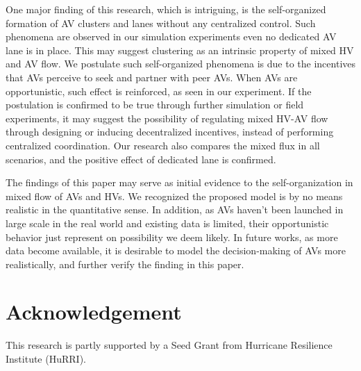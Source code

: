 \documentclass[oneside,letter,11pt]{article}
\begin{document}
One major finding of this research, which is intriguing, is the self-organized formation of AV clusters and lanes without any centralized control. Such phenomena are observed in our simulation experiments even no dedicated AV lane is in place. This may suggest clustering as an intrinsic property of mixed HV and AV flow. We postulate such self-organized phenomena is due to the incentives that AVs perceive to seek and partner with peer AVs. When AVs are opportunistic, such effect is reinforced, as seen in our experiment. If the postulation is confirmed to be true through further simulation or field experiments, it may suggest the possibility of regulating mixed HV-AV flow through designing or inducing decentralized incentives, instead of performing centralized coordination. Our research also compares the mixed flux in all scenarios, and the positive effect of dedicated lane is confirmed. 

The findings of this paper may serve as initial evidence to the self-organization in mixed flow of AVs and HVs. We recognized the proposed model is by no means realistic in the quantitative sense. In addition, as AVs haven't been launched in large scale in the real world and existing data is limited, their opportunistic behavior just represent on possibility we deem likely. In future works, as more data become available, it is desirable to model the decision-making of AVs more realistically, and further verify the finding in this paper.

\section{Acknowledgement}

This research is partly supported by a Seed Grant from Hurricane Resilience Institute (HuRRI). 




%
%



\end{document}
